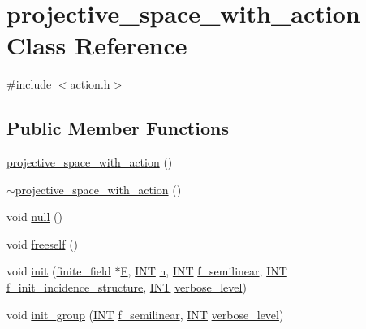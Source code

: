 \hypertarget{classprojective__space__with__action}{}\section{projective\+\_\+space\+\_\+with\+\_\+action Class Reference}
\label{classprojective__space__with__action}


{\ttfamily \#include $<$action.\+h$>$}

\subsection*{Public Member Functions}
\begin{DoxyCompactItemize}
\item 
\mbox{\hyperlink{classprojective__space__with__action_a43239d32913be90e91e6263bb0e71eaa}{projective\+\_\+space\+\_\+with\+\_\+action}} ()
\item 
\mbox{\hyperlink{classprojective__space__with__action_af7d944126c94da25c8c348cc5921099f}{$\sim$projective\+\_\+space\+\_\+with\+\_\+action}} ()
\item 
void \mbox{\hyperlink{classprojective__space__with__action_a3b7293e9760710a6b3bf462e92a4200c}{null}} ()
\item 
void \mbox{\hyperlink{classprojective__space__with__action_aef92eed72366b556a51c46c7f0e096ba}{freeself}} ()
\item 
void \mbox{\hyperlink{classprojective__space__with__action_a10163a9ca20415bd9a9d4370470143ba}{init}} (\mbox{\hyperlink{classfinite__field}{finite\+\_\+field}} $\ast$\mbox{\hyperlink{classprojective__space__with__action_ad08b5f89f664d8df95bbb8cf18077f03}{F}}, \mbox{\hyperlink{galois_8h_a09fddde158a3a20bd2dcadb609de11dc}{I\+NT}} \mbox{\hyperlink{classprojective__space__with__action_aa438c34f24f61c86c06546e95945fdf6}{n}}, \mbox{\hyperlink{galois_8h_a09fddde158a3a20bd2dcadb609de11dc}{I\+NT}} \mbox{\hyperlink{classprojective__space__with__action_a2426720440383541ff6b5aa868c368bb}{f\+\_\+semilinear}}, \mbox{\hyperlink{galois_8h_a09fddde158a3a20bd2dcadb609de11dc}{I\+NT}} \mbox{\hyperlink{classprojective__space__with__action_acaf0ac596355e7d61c940a0517e4a419}{f\+\_\+init\+\_\+incidence\+\_\+structure}}, \mbox{\hyperlink{galois_8h_a09fddde158a3a20bd2dcadb609de11dc}{I\+NT}} \mbox{\hyperlink{simeon_8_c_a818073fbcc2f439e7c56952f67386122}{verbose\+\_\+level}})
\item 
void \mbox{\hyperlink{classprojective__space__with__action_a1f23de4057fa97f038b1ec977c9d42c4}{init\+\_\+group}} (\mbox{\hyperlink{galois_8h_a09fddde158a3a20bd2dcadb609de11dc}{I\+NT}} \mbox{\hyperlink{classprojective__space__with__action_a2426720440383541ff6b5aa868c368bb}{f\+\_\+semilinear}}, \mbox{\hyperlink{galois_8h_a09fddde158a3a20bd2dcadb609de11dc}{I\+NT}} \mbox{\hyperlink{simeon_8_c_a818073fbcc2f439e7c56952f67386122}{verbose\+\_\+level}})

\end{DoxyCompactItemize}
